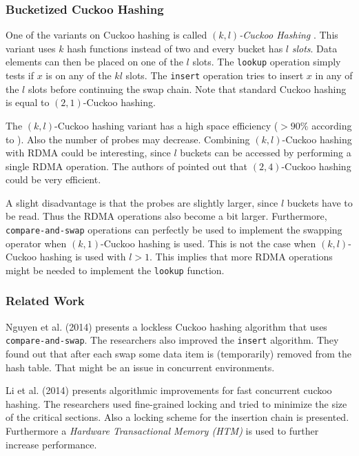 \subsubsection{Bucketized Cuckoo Hashing}
One of the variants on Cuckoo hashing is called \textit{$(k, l)$-Cuckoo Hashing} \cite{180323}. This variant uses $k$ hash functions instead of two and every bucket has $l$ \emph{slots}. Data elements can then be placed on one of the $l$ slots. The \texttt{lookup} operation simply tests if $x$ is on any of the $kl$ slots. The \texttt{insert} operation tries to insert $x$ in any of the $l$ slots before continuing the swap chain. Note that standard Cuckoo hashing is equal to $(2, 1)$-Cuckoo hashing. 

The $(k, l)$-Cuckoo hashing variant has a high space efficiency ($>90\%$ according to \cite{180323}). Also the number of probes may decrease. Combining $(k, l)$-Cuckoo hashing with RDMA could be interesting, since $l$ buckets can be accessed by performing a single RDMA operation. The authors of \cite{pilaf} pointed out that $(2, 4)$-Cuckoo hashing could be very efficient. 

A slight disadvantage is that the probes are slightly larger, since $l$ buckets have to be read. Thus the RDMA operations also become a bit larger. Furthermore, \texttt{compare-and-swap} operations can perfectly be used to implement the swapping operator when $(k, 1)$-Cuckoo hashing is used. This is not the case when $(k, l)$-Cuckoo hashing is used with $l > 1$. This implies that more RDMA operations might be needed to implement the \texttt{lookup} function.

\subsubsection{Related Work}
Nguyen et al. \cite{nguyen2014lock} (2014) presents a lockless Cuckoo hashing algorithm that uses \texttt{compare-and-swap}. The researchers also improved the \texttt{insert} algorithm. They found out that after each swap some data item is (temporarily) removed from the hash table. That might be an issue in concurrent environments.

Li et al. \cite{Li:2014:AIF:2592798.2592820} (2014) presents algorithmic improvements for fast concurrent cuckoo hashing. The researchers used fine-grained locking and tried to minimize the size of the critical sections. Also a locking scheme for the insertion chain is presented. Furthermore a \emph{Hardware Transactional Memory (HTM)} is used to further increase performance.

